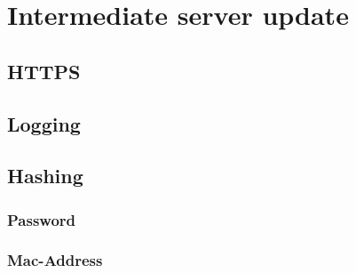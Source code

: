 \section{Intermediate server update}

\subsection*{HTTPS}

\subsection*{Logging}

\subsection*{Hashing}

\subsubsection*{Password}

\subsubsection*{Mac-Address}